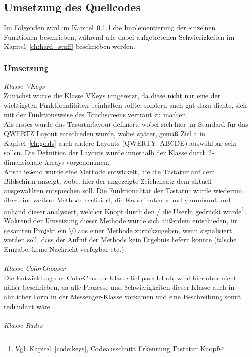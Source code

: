 \documentclass[a4paper, 11pt]{scrartcl}
\begin{document}
\subsection{Umsetzung des Quellcodes}
Im Folgenden wird im Kapitel~\ref{ch:umsetzung_umsetzung} die Implementierung der einzelnen Funktionen beschrieben, während alle dabei aufgetretenen Schwierigkeiten
im Kapitel~\ref{ch:hard_stuff} beschrieben werden.
\subsubsection{Umsetzung}\label{ch:umsetzung_umsetzung}
\textit{Klasse VKeys}
\\
Zunächst wurde die Klasse VKeys umgesetzt, da diese nicht nur eine der wichtigsten Funktionalitäten beinhalten sollte, sondern auch gut dazu diente, 
sich mit der Funktionsweise des Touchscreens vertraut zu machen. 
\\
Als erstes wurde das Tastaturlayout definiert, wobei sich hier im Standard für das QWERTZ Layout entschieden wurde, wobei später, gemäß Ziel a in Kapitel~\ref{ch:goals}
auch andere Layouts (QWERTY, ABCDE) auswählbar sein sollen. Die Definition der Layouts wurde innerhalb der Klasse durch 2-dimensionale Arrays vorgenommen.
\\
Anschließend wurde eine Methode entwickelt, die die Tastatur auf dem Bildschirm anzeigt, wobei hier der angezeigte Zeichensatz dem aktuell ausgewählten entsprechen soll.
Die Funktionalität der Tastatur wurde wiederum über eine weitere Methode realisiert, die Koordinaten x und y annimmt und anhand dieser analysiert, welcher Knopf
durch den / die UserIn gedrückt wurde\footnote{Vgl. Kapitel~\ref{code:keys}, Codeausschnitt \glqq Erkennung Tastatur Knopf\grqq}. Während der Umsetzung dieser Methode
wurde sich außerdem entschieden, im gesamten Projekt ein \glqq\textbackslash 0\grqq{} aus einer Methode zurückzugeben, wenn signalisiert werden soll, dass der
Aufruf der Methode kein Ergebnis liefern konnte (falsche Eingabe, keine Nachricht verfügbar etc.). 
\\
\\
\textit{Klasse ColorChooser}
\\
Die Entwicklung der ColorChooser Klasse lief parallel ab, wird hier aber nicht näher beschrieben, da alle Prozesse und Schwierigkeiten dieser Klasse auch in ähnlicher Form in 
der Messenger-Klasse vorkamen und eine Beschreibung somit redundant wäre.
\\
\\
\textit{Klasse Radio}
\\
\end{document}
